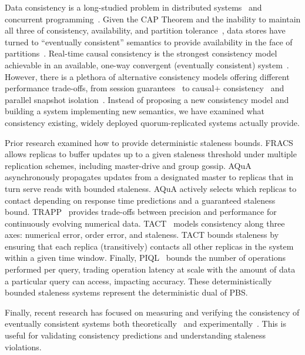 \documentclass{vldb}
\begin{document}
Data consistency is a long-studied problem in distributed
systems~\cite{consistency-partitioned, danger-rep} and concurrent
programming~\cite{linearizability}.  Given the CAP Theorem and the
inability to maintain all three of consistency, availability, and
partition tolerance~\cite{cap-proof}, data stores have turned to
``eventually consistent'' semantics to provide availability in the
face of partitions~\cite{consistency-partitioning, vogels-defs}.
Real-time causal consistency is the strongest consistency model
achievable in an available, one-way convergent (eventually consistent)
system~\cite{rtc-proof}. However, there is a plethora of alternative
consistency models offering different performance trade-offs, from
session guarantees~\cite{sessionguarantees} to causal+
consistency~\cite{cops} and parallel snapshot isolation~\cite{walter}.
Instead of proposing a new consistency model and building a system
implementing new semantics, we have examined what consistency
existing, widely deployed quorum-replicated systems actually provide.

Prior research examined how to provide deterministic staleness bounds.
FRACS~\cite{frac} allows replicas to buffer updates up to a given
staleness threshold under multiple replication schemes, including
master-drive and group gossip.  AQuA~\cite{aqua} asynchronously
propagates updates from a designated master to replicas that in turn
serve reads with bounded staleness.  AQuA actively selects which
replicas to contact depending on response time predictions and a
guaranteed staleness bound.  TRAPP~\cite{trapp} provides trade-offs
between precision and performance for continuously evolving numerical
data.  TACT~\cite{vahdat-article, vahdat-bounded} models consistency
along three axes: numerical error, order error, and staleness.  TACT
bounds staleness by ensuring that each replica (transitively) contacts
all other replicas in the system within a given time window.  Finally,
PIQL~\cite{piql} bounds the number of operations performed per query,
trading operation latency at scale with the amount of data a
particular query can access, impacting accuracy. These
deterministically bounded staleness systems represent the
deterministic dual of PBS.

Finally, recent research has focused on measuring and verifying the
consistency of eventually consistent systems both theoretically~\cite{podc-hpl} and
experimentally~\cite{measure-consistency, consistency-cidr}. This is useful for validating
consistency predictions and understanding staleness violations.
\end{document}
